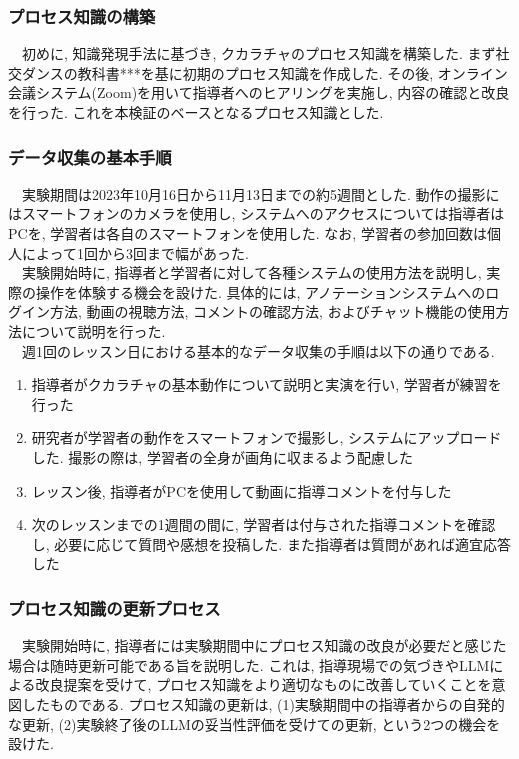 \subsubsection{プロセス知識の構築}
　初めに, 知識発現手法に基づき, クカラチャのプロセス知識を構築した. まず社交ダンスの教科書{***}を基に初期のプロセス知識を作成した. その後, オンライン会議システム(Zoom)を用いて指導者へのヒアリングを実施し, 内容の確認と改良を行った. これを本検証のベースとなるプロセス知識とした.\\


\subsubsection{データ収集の基本手順}
　実験期間は2023年10月16日から11月13日までの約5週間とした. 動作の撮影にはスマートフォンのカメラを使用し, システムへのアクセスについては指導者はPCを, 学習者は各自のスマートフォンを使用した. なお, 学習者の参加回数は個人によって1回から3回まで幅があった.\\
　実験開始時に, 指導者と学習者に対して各種システムの使用方法を説明し, 実際の操作を体験する機会を設けた. 具体的には, アノテーションシステムへのログイン方法, 動画の視聴方法, コメントの確認方法, およびチャット機能の使用方法について説明を行った.\\
　週1回のレッスン日における基本的なデータ収集の手順は以下の通りである.\\
\begin{enumerate}
    \item 指導者がクカラチャの基本動作について説明と実演を行い, 学習者が練習を行った
    \item 研究者が学習者の動作をスマートフォンで撮影し, システムにアップロードした. 撮影の際は, 学習者の全身が画角に収まるよう配慮した
    \item レッスン後, 指導者がPCを使用して動画に指導コメントを付与した
    \item 次のレッスンまでの1週間の間に, 学習者は付与された指導コメントを確認し, 必要に応じて質問や感想を投稿した. また指導者は質問があれば適宜応答した
\end{enumerate}

\subsubsection{プロセス知識の更新プロセス}
　実験開始時に, 指導者には実験期間中にプロセス知識の改良が必要だと感じた場合は随時更新可能である旨を説明した. これは, 指導現場での気づきやLLMによる改良提案を受けて, プロセス知識をより適切なものに改善していくことを意図したものである. プロセス知識の更新は, (1)実験期間中の指導者からの自発的な更新, (2)実験終了後のLLMの妥当性評価を受けての更新, という2つの機会を設けた.\\

